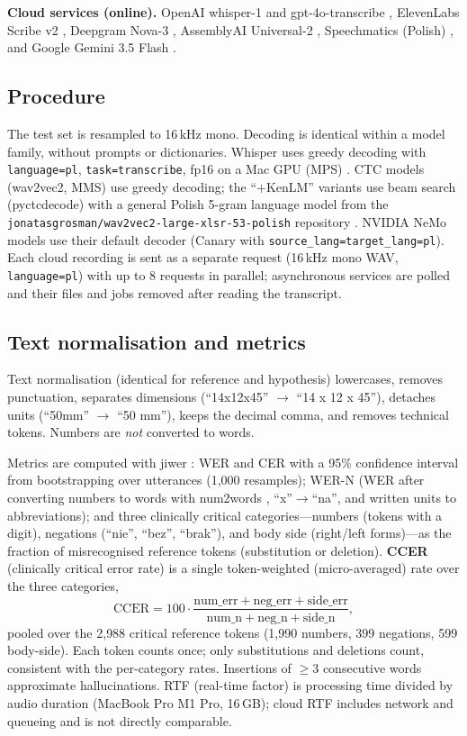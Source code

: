 \documentclass[conference]{IEEEtran}
\begin{document}
\noindent\textbf{Cloud services (online).} OpenAI whisper-1 and gpt-4o-transcribe \cite{r11}, ElevenLabs Scribe v2 \cite{r12}, Deepgram Nova-3 \cite{r13}, AssemblyAI Universal-2 \cite{r14}, Speechmatics (Polish) \cite{r15}, and Google Gemini 3.5 Flash \cite{r16}.

\subsection{Procedure}
The test set is resampled to 16\,kHz mono. Decoding is identical within a model family, without prompts or dictionaries. Whisper uses greedy decoding with \texttt{language=pl}, \texttt{task=transcribe}, fp16 on a Mac GPU (MPS) \cite{r2,r17}. CTC models (wav2vec2, MMS) use greedy decoding; the ``+KenLM'' variants use beam search (pyctcdecode) with a general Polish 5-gram language model from the \texttt{jonatasgrosman/wav2vec2-large-xlsr-53-polish} repository \cite{r9,r19,r20}. NVIDIA NeMo models use their default decoder (Canary with \texttt{source\_lang=target\_lang=pl}). Each cloud recording is sent as a separate request (16\,kHz mono WAV, \texttt{language=pl}) with up to 8 requests in parallel; asynchronous services are polled and their files and jobs removed after reading the transcript.

\subsection{Text normalisation and metrics}
Text normalisation (identical for reference and hypothesis) lowercases, removes punctuation, separates dimensions (``14x12x45'' $\to$ ``14 x 12 x 45''), detaches units (``50mm'' $\to$ ``50 mm''), keeps the decimal comma, and removes technical tokens. Numbers are \emph{not} converted to words.

Metrics are computed with jiwer \cite{r18}: WER and CER with a 95\% confidence interval from bootstrapping over utterances (1{,}000 resamples); WER-N (WER after converting numbers to words with num2words \cite{r23}, ``x''$\to$``na'', and written units to abbreviations); and three clinically critical categories---numbers (tokens with a digit), negations (``nie'', ``bez'', ``brak''), and body side (right/left forms)---as the fraction of misrecognised reference tokens (substitution or deletion). \textbf{CCER} (clinically critical error rate) is a single token-weighted (micro-averaged) rate over the three categories,
\begin{equation}
\mathrm{CCER} = 100\cdot\frac{\text{num\_err}+\text{neg\_err}+\text{side\_err}}{\text{num\_n}+\text{neg\_n}+\text{side\_n}},
\end{equation}
pooled over the 2{,}988 critical reference tokens (1{,}990 numbers, 399 negations, 599 body-side). Each token counts once; only substitutions and deletions count, consistent with the per-category rates. Insertions of $\ge 3$ consecutive words approximate hallucinations. RTF (real-time factor) is processing time divided by audio duration (MacBook Pro M1 Pro, 16\,GB); cloud RTF includes network and queueing and is not directly comparable.
\end{document}
